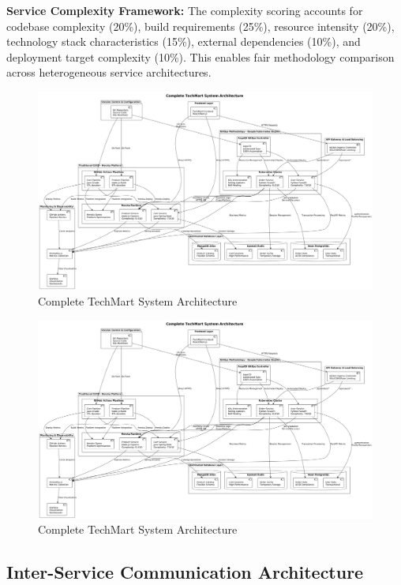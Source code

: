 \textbf{Service Complexity Framework:}
The complexity scoring accounts for codebase complexity (20\%), build requirements (25\%), resource intensity (20\%), technology stack characteristics (15\%), external dependencies (10\%), and deployment target complexity (10\%). This enables fair methodology comparison across heterogeneous service architectures.

\begin{figure}[h]
\centering
\includegraphics[width=1.0\textwidth]{figures/Complete-System-Architecture-Diagram.png}
\caption{Complete TechMart System Architecture}
\label{fig:complete-system-architecture}
\end{figure}

\begin{figure}[H]
\centering
\includegraphics[width=1.0\textwidth]{figures/Complete-System-Architecture-Diagram.png}
\caption{Complete TechMart System Architecture}
\label{fig:complete-system-architecture}
\end{figure}

\subsection{Inter-Service Communication Architecture}

